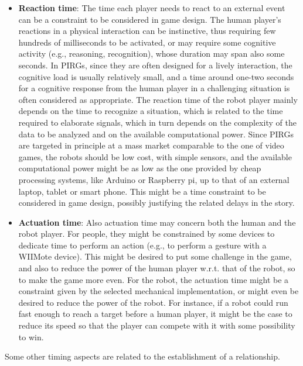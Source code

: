 \begin{itemize}
\item \textbf{Reaction time}: The time each player needs to react to an external event can be a constraint to be considered in game design. The human player's reactions in a physical interaction can be instinctive, thus requiring few hundreds of milliseconds to be activated, or may require some cognitive activity (e.g., reasoning, recognition), whose duration may span also some seconds. In PIRGs, since they are often designed for a lively interaction, the cognitive load is usually relatively small, and a time around one-two seconds for a cognitive response from the human player in a challenging situation is often considered as appropriate. The reaction time of the robot player mainly depends on the time to recognize a situation, which is related to the time required to elaborate signals, which in turn depends on the complexity of the data to be analyzed and on the available computational power. Since PIRGs are targeted in principle at a mass market comparable to the one of video games, the robots should be low cost, with simple sensors, and the available computational power might be as low as the one provided by cheap processing systems, like Arduino or Raspberry pi, up to that of an external laptop, tablet or smart phone. This might be a time constraint to be considered in game design, possibly justifying the related delays in the story.

\item \textbf{Actuation time}: Also actuation time may concern both the human and the robot player. For people, they might be constrained by some devices to dedicate time to perform an action (e.g., to perform a gesture with a WIIMote device). This might be desired to put some challenge in the game, and also to reduce the power of the human player w.r.t. that of the robot, so to make the game more even. For the robot, the actuation time might be a constraint given by the selected mechanical implementation, or might even be desired to reduce the power of the robot. For instance, if a robot could run fast enough to reach a target before a human player, it might be the case to reduce its speed so that the player can compete with it with some possibility to win.
\end{itemize}

Some other timing aspects are related to the establishment of a relationship.

